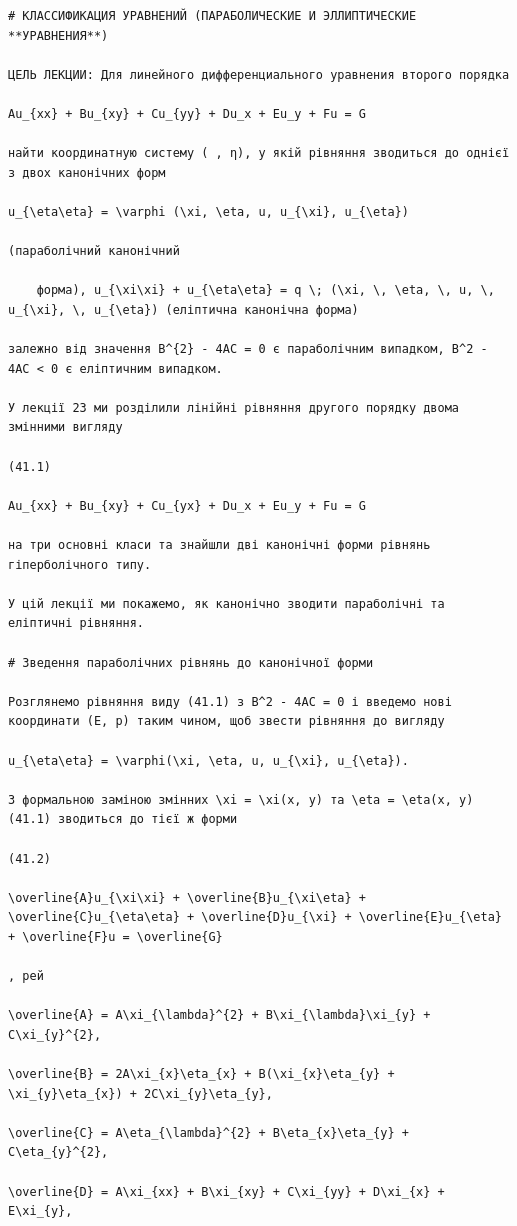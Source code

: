 \documentclass[
  ukrainian,
]{article}
\begin{document}
\begin{verbatim}
# КЛАССИФИКАЦИЯ УРАВНЕНИЙ (ПАРАБОЛИЧЕСКИЕ И ЭЛЛИПТИЧЕСКИЕ **УРАВНЕНИЯ**)

ЦЕЛЬ ЛЕКЦИИ: Для линейного дифференциального уравнения второго порядка

Au_{xx} + Bu_{xy} + Cu_{yy} + Du_x + Eu_y + Fu = G

найти координатную систему ( , η), у якій рівняння зводиться до однієї з двох канонічних форм

u_{\eta\eta} = \varphi (\xi, \eta, u, u_{\xi}, u_{\eta})

(параболічний канонічний

    форма), u_{\xi\xi} + u_{\eta\eta} = q \; (\xi, \, \eta, \, u, \, u_{\xi}, \, u_{\eta}) (еліптична канонічна форма)

залежно від значення B^{2} - 4AC = 0 є параболічним випадком, B^2 - 4AC < 0 є еліптичним випадком.

У лекції 23 ми розділили лінійні рівняння другого порядку двома змінними вигляду

(41.1)

Au_{xx} + Bu_{xy} + Cu_{yx} + Du_x + Eu_y + Fu = G

на три основні класи та знайшли дві канонічні форми рівнянь гіперболічного типу.

У цій лекції ми покажемо, як канонічно зводити параболічні та еліптичні рівняння.

# Зведення параболічних рівнянь до канонічної форми

Розглянемо рівняння виду (41.1) з B^2 - 4AC = 0 і введемо нові координати (E, p) таким чином, щоб звести рівняння до вигляду

u_{\eta\eta} = \varphi(\xi, \eta, u, u_{\xi}, u_{\eta}).

З формальною заміною змінних \xi = \xi(x, y) та \eta = \eta(x, y) (41.1) зводиться до тієї ж форми

(41.2)

\overline{A}u_{\xi\xi} + \overline{B}u_{\xi\eta} + \overline{C}u_{\eta\eta} + \overline{D}u_{\xi} + \overline{E}u_{\eta} + \overline{F}u = \overline{G}

, рей

\overline{A} = A\xi_{\lambda}^{2} + B\xi_{\lambda}\xi_{y} + C\xi_{y}^{2},

\overline{B} = 2A\xi_{x}\eta_{x} + B(\xi_{x}\eta_{y} + \xi_{y}\eta_{x}) + 2C\xi_{y}\eta_{y},

\overline{C} = A\eta_{\lambda}^{2} + B\eta_{x}\eta_{y} + C\eta_{y}^{2},

\overline{D} = A\xi_{xx} + B\xi_{xy} + C\xi_{yy} + D\xi_{x} + E\xi_{y},


\end{verbatim}
\end{document}
